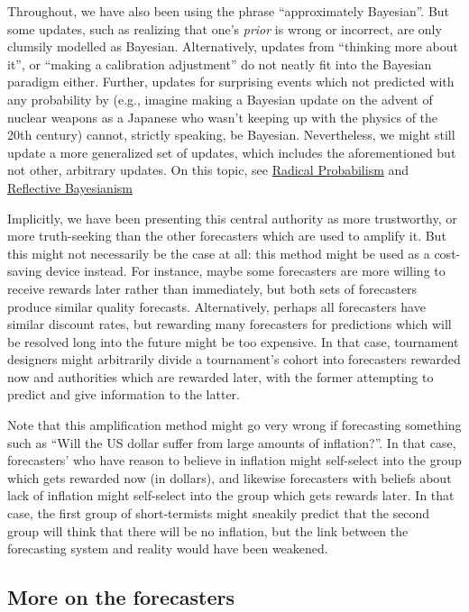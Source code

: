 \documentclass[]{article}
\begin{document}
Throughout, we have also been using the phrase ``approximately
Bayesian''. But some updates, such as realizing that one's \emph{prior}
is wrong or incorrect, are only clumsily modelled as Bayesian.
Alternatively, updates from ``thinking more about it'', or ``making a
calibration adjustment'' do not neatly fit into the Bayesian paradigm
either. Further, updates for surprising events which not predicted with
any probability by (e.g., imagine making a Bayesian update on the advent
of nuclear weapons as a Japanese who wasn't keeping up with the physics
of the 20th century) cannot, strictly speaking, be Bayesian.
Nevertheless, we might still update a more generalized set of updates,
which includes the aforementioned but not other, arbitrary updates. On
this topic, see
\href{https://www.lesswrong.com/posts/xJyY5QkQvNJpZLJRo/radical-probabilism-1}{Radical
Probabilism} and
\href{https://www.lesswrong.com/posts/vpvLqinp4FoigqvKy/reflective-bayesianism}{Reflective
Bayesianism}

Implicitly, we have been presenting this central authority as more
trustworthy, or more truth-seeking than the other forecasters which are
used to amplify it. But this might not necessarily be the case at all:
this method might be used as a cost-saving device instead. For instance,
maybe some forecasters are more willing to receive rewards later rather
than immediately, but both sets of forecasters produce similar quality
forecasts. Alternatively, perhaps all forecasters have similar discount
rates, but rewarding many forecasters for predictions which will be
resolved long into the future might be too expensive. In that case,
tournament designers might arbitrarily divide a tournament's cohort into
forecasters rewarded now and authorities which are rewarded later, with
the former attempting to predict and give information to the latter.

Note that this amplification method might go very wrong if forecasting
something such as ``Will the US dollar suffer from large amounts of
inflation?''. In that case, forecasters' who have reason to believe in
inflation might self-select into the group which gets rewarded now (in
dollars), and likewise forecasters with beliefs about lack of inflation
might self-select into the group which gets rewards later. In that case,
the first group of short-termists might sneakily predict that the second
group will think that there will be no inflation, but the link between
the forecasting system and reality would have been weakened.

\hypertarget{more-on-the-forecasters}{%
\subsection{More on the forecasters}\label{more-on-the-forecasters}}
\end{document}
